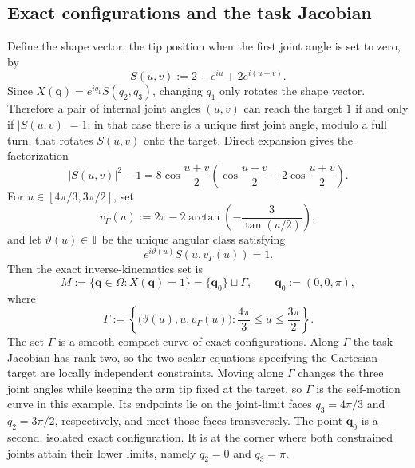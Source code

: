 \documentclass[11pt]{amsart}
\numberwithin{equation}{section}
\theoremstyle{definition}
\theoremstyle{remark}
\begin{document}
\subsection{Exact configurations and the task Jacobian}

Define the shape vector, the tip position when the first joint angle is set to
zero, by
\begin{equation}\label{eq:robot-shape-vector}
 S(u,v):=2+e^{iu}+2e^{i(u+v)}.
\end{equation}
Since $X(\bm q)=e^{iq_1}S(q_2,q_3)$, changing $q_1$ only rotates the shape
vector.  Therefore a pair of internal joint angles $(u,v)$ can reach the
target $1$ if and only if $|S(u,v)|=1$; in that case there is a unique first
joint angle, modulo a full turn, that rotates $S(u,v)$ onto the target.
Direct expansion gives the factorization
\begin{equation}\label{eq:robot-shape-factorization}
 |S(u,v)|^2-1
 =8\cos\frac{u+v}{2}
 \left(
  \cos\frac{u-v}{2}+2\cos\frac{u+v}{2}
 \right).
\end{equation}
For $u\in[4\pi/3,3\pi/2]$, set
\begin{equation}\label{eq:robot-vGamma}
 v_\Gamma(u):=
 2\pi-2\arctan\left(-\frac{3}{\tan(u/2)}\right),
\end{equation}
and let $\vartheta(u)\in\mathbb T$ be the unique angular class satisfying
\begin{equation}\label{eq:robot-vartheta}
 e^{i\vartheta(u)}S(u,v_\Gamma(u))=1.
\end{equation}
Then the exact inverse-kinematics set is
\begin{equation}\label{eq:robot-minimum-set}
 M:=\{\bm q\in\Omega:X(\bm q)=1\}
 =\{\bm q_0\}\sqcup\Gamma,
 \qquad
 \bm q_0:=(0,0,\pi),
\end{equation}
where
\begin{equation}\label{eq:robot-regular-arc}
 \Gamma:=\left\{
  \bigl(\vartheta(u),u,v_\Gamma(u)\bigr):
  \frac{4\pi}{3}\le u\le\frac{3\pi}{2}
 \right\}.
\end{equation}
The set $\Gamma$ is a smooth compact curve of exact configurations.  Along
$\Gamma$ the task Jacobian has rank two, so the two scalar equations specifying
the Cartesian target are locally independent constraints.  Moving along $\Gamma$ changes the three joint angles while
keeping the arm tip fixed at the target, so $\Gamma$ is the self-motion curve
in this example.  Its endpoints lie on the joint-limit faces $q_3=4\pi/3$ and
$q_2=3\pi/2$, respectively, and meet those faces transversely.  The point
$\bm q_0$ is a second, isolated exact configuration.  It is at the corner where
both constrained joints attain their lower limits, namely $q_2=0$ and
$q_3=\pi$.
\end{document}
